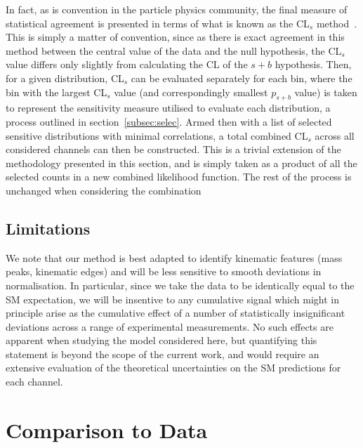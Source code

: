 \documentclass[floatfix]{article}
\begin{document}
In fact, as is convention in the particle physics community, the final measure of statistical agreement is presented in terms of what is known as the CL$_{s}$ 
method~\cite{Junk:1999kv,Read:2002hq}. This is simply a matter of convention, since as there is exact agreement in this method between the central value of the 
data and the null hypothesis, the CL$_{s}$ value differs only slightly from calculating the CL of the $s+b$ hypothesis. Then, for a given distribution, CL$_{s}$ 
can be evaluated separately for each bin, where the bin with the largest CL$_{s}$ value (and correspondingly smallest $p_{s+b}$ value) is taken to represent the 
sensitivity measure utilised to evaluate each distribution, a process outlined in section~\ref{subsec:selec}. Armed then with a list of selected sensitive 
distributions with minimal correlations, a total combined CL$_{s}$ across all considered channels can then be constructed. This is a trivial extension of 
the methodology presented in this section, and is simply taken as a product of all the selected counts in a new combined likelihood function. 
The rest of the process is unchanged when considering the combination


\subsection{Limitations}

We note that our method is best adapted to identify kinematic features (mass peaks, kinematic edges) and will be less sensitive to smooth
deviations in normalisation. In particular, since we take the data to be identically equal to the SM expectation, we will be insentive 
to any cumulative signal which might in principle arise as the cumulative effect of a number of statistically insignificant deviations 
across a range of experimental measurements.
No such effects are apparent when studying the model considered here, but quantifying this statement is beyond the scope of the current work, 
and would require an extensive evaluation of the theoretical uncertainties on the SM predictions for each channel.




\section{Comparison to Data}\label{sec:kinematics}
\end{document}
